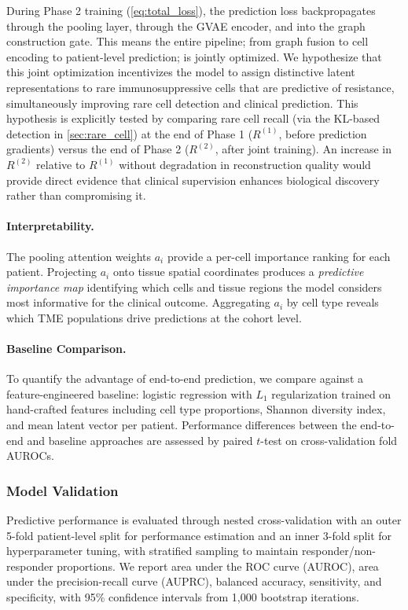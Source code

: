 \documentclass{article}
\begin{document}
During Phase 2 training (\cref{eq:total_loss}), the prediction loss backpropagates through the pooling layer, through the GVAE encoder, and into the graph construction gate. This means the entire pipeline; from graph fusion to cell encoding to patient-level prediction; is jointly optimized. We hypothesize that this joint optimization incentivizes the model to assign distinctive latent representations to rare immunosuppressive cells that are predictive of resistance, simultaneously improving rare cell detection and clinical prediction. This hypothesis is explicitly tested by comparing rare cell recall (via the KL-based detection in \cref{sec:rare_cell}) at the end of Phase 1 ($R^{(1)}$, before prediction gradients) versus the end of Phase 2 ($R^{(2)}$, after joint training). An increase in $R^{(2)}$ relative to $R^{(1)}$ without degradation in reconstruction quality would provide direct evidence that clinical supervision enhances biological discovery rather than compromising it.

\paragraph{Interpretability.} The pooling attention weights $a_i$ provide a per-cell importance ranking for each patient. Projecting $a_i$ onto tissue spatial coordinates produces a \textit{predictive importance map} identifying which cells and tissue regions the model considers most informative for the clinical outcome. Aggregating $a_i$ by cell type reveals which TME populations drive predictions at the cohort level.

\paragraph{Baseline Comparison.} To quantify the advantage of end-to-end prediction, we compare against a feature-engineered baseline: logistic regression with $L_1$ regularization trained on hand-crafted features including cell type proportions, Shannon diversity index, and mean latent vector per patient. Performance differences between the end-to-end and baseline approaches are assessed by paired $t$-test on cross-validation fold AUROCs.


\subsubsection{Model Validation}

Predictive performance is evaluated through nested cross-validation with an outer 5-fold patient-level split for performance estimation and an inner 3-fold split for hyperparameter tuning, with stratified sampling to maintain responder/non-responder proportions. We report area under the ROC curve (AUROC), area under the precision-recall curve (AUPRC), balanced accuracy, sensitivity, and specificity, with 95\% confidence intervals from 1{,}000 bootstrap iterations.
\end{document}
